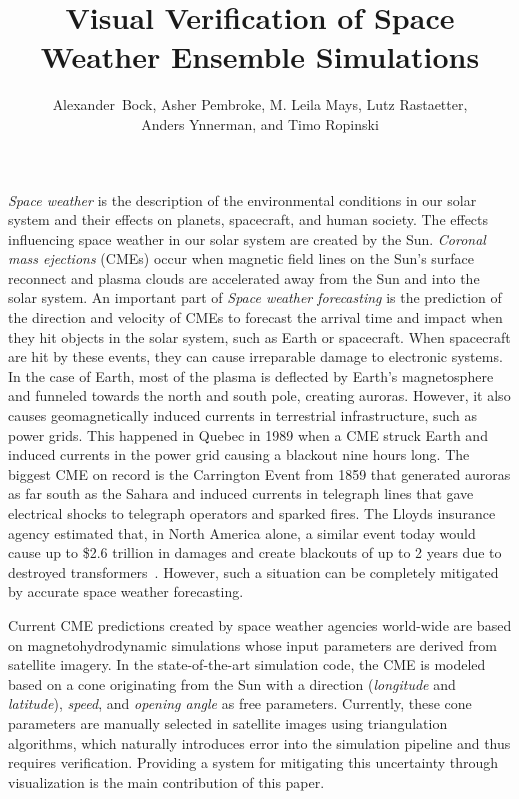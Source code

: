 \documentclass[journal]{vgtc}                %
\title{Visual Verification of Space Weather Ensemble Simulations}
\author{
    Alexander~Bock,
    Asher Pembroke,
    M. Leila Mays,
    Lutz Rastaetter,\\%
    Anders Ynnerman,
    and Timo Ropinski%
}
\begin{document}
\maketitle
\emph{Space weather} is the description of the environmental conditions in our solar system and their effects on planets, spacecraft, and human society. The effects influencing space weather in our solar system are created by the Sun. \emph{Coronal mass ejections} (CMEs) occur when magnetic field lines on the Sun's surface reconnect and plasma clouds are accelerated away from the Sun and into the solar system. An important part of \emph{Space weather forecasting} is the prediction of the direction and velocity of CMEs to forecast the arrival time and impact when they hit objects in the solar system, such as Earth or spacecraft. When spacecraft are hit by these events, they can cause irreparable damage to electronic systems. In the case of Earth, most of the plasma is deflected by Earth's magnetosphere and funneled towards the north and south pole, creating auroras. However, it also causes geomagnetically induced currents in terrestrial infrastructure, such as power grids. This happened in Quebec in 1989 when a CME struck Earth and induced currents in the power grid causing a blackout nine hours long. The biggest CME on record is the Carrington Event from 1859 that generated auroras as far south as the Sahara and induced currents in telegraph lines that gave electrical shocks to telegraph operators and sparked fires. The Lloyds insurance agency estimated that, in North America alone, a similar event today would cause up to \$2.6 trillion in damages and create blackouts of up to 2 years due to destroyed transformers~\cite{lloyds2013impact}. However, such a situation can be completely mitigated by accurate space weather forecasting.

Current CME predictions created by space weather agencies world-wide are based on magnetohydrodynamic simulations whose input parameters are derived from satellite imagery. In the state-of-the-art simulation code, the CME is modeled based on a cone originating from the Sun with a direction (\emph{longitude} and \emph{latitude}), \emph{speed}, and \emph{opening angle} as free parameters. Currently, these cone parameters are manually selected in satellite images using triangulation algorithms, which naturally introduces error into the simulation pipeline and thus requires verification. Providing a system for mitigating this uncertainty through visualization is the main contribution of this paper.
\end{document}
